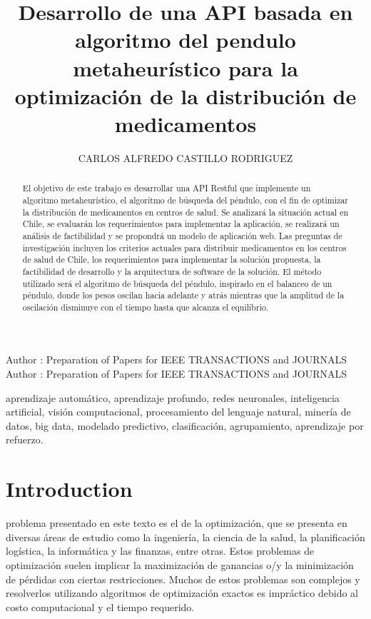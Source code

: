 \documentclass{ieeeaccess}
\begin{document}

\title{Desarrollo de una API basada en algoritmo del pendulo metaheurístico para la optimización de la distribución de medicamentos}
\author{\uppercase{Carlos Alfredo Castillo Rodriguez}}
\address[1]{Universidad Bernardo Ohiggins, Santiago de Chile, Chile, (e-mail: cacr1990@gmail.com)}
\tfootnote{}

\markboth
{Author \headeretal: Preparation of Papers for IEEE TRANSACTIONS and JOURNALS}
{Author \headeretal: Preparation of Papers for IEEE TRANSACTIONS and JOURNALS}


\begin{abstract}
El objetivo de este trabajo es desarrollar una API Restful que implemente un algoritmo metaheurístico, el algoritmo de búsqueda del péndulo, con el fin de optimizar la distribución de medicamentos en centros de salud. Se analizará la situación actual en Chile, se evaluarán los requerimientos para implementar la aplicación, se realizará un análisis de factibilidad y se propondrá un modelo de aplicación web. Las preguntas de investigación incluyen los criterios actuales para distribuir medicamentos en los centros de salud de Chile, los requerimientos para implementar la solución propuesta, la factibilidad de desarrollo y la arquitectura de software de la solución. El método utilizado será el algoritmo de búsqueda del péndulo, inspirado en el balanceo de un péndulo, donde los pesos oscilan hacia adelante y atrás mientras que la amplitud de la oscilación disminuye con el tiempo hasta que alcanza el equilibrio.
\end{abstract}

\begin{keywords}
aprendizaje automático, aprendizaje profundo, redes neuronales, inteligencia artificial, visión computacional, procesamiento del lenguaje natural, minería de datos, big data, modelado predictivo, clasificación, agrupamiento, aprendizaje por refuerzo.
\end{keywords}

\titlepgskip=-15pt

\maketitle

\section{Introduction}
\label{sec:introduction}
 problema presentado en este texto es el de la optimización, 
que se presenta en diversas áreas de estudio como la ingeniería, la ciencia de la salud, 
la planificación logística, la informática y las finanzas, entre otras. Estos problemas de optimización 
suelen implicar la maximización de ganancias o/y la minimización de pérdidas con ciertas restricciones. 
Muchos de estos problemas son complejos y resolverlos utilizando algoritmos de optimización exactos es impráctico debido al costo computacional
y el tiempo requerido.
\end{document}
